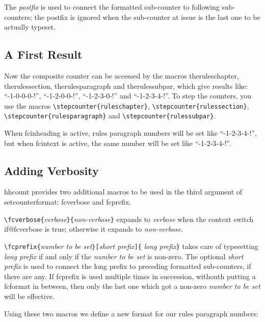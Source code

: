 \documentclass[11pt]{article}
\makeatletter
\def\packagename#1{{\sffamily #1}}     %
\def\macroname#1{{\ttfamily\@ttbs#1}}  %
\def\hhcount{\packagename{hhcount}\xspace}
\def\={\verb=}
\def\<#1>{\macroname{#1}}
\def\:{\linebreak[1]}
\makeatother
\begin{document}
The \textit{postfix} is used to connect the formatted sub-counter to following
sub-counters; the postfix is ignored when the sub-counter at issue is the
last one to be actually typeset.

\subsection{A First Result}

Now the composite counter can be accessed by the macros
\<theruleschapter>, \<therulessection>, \<therulesparagraph>
and \<therulessubpar>, which give results like:
``-1-0-0-0-!'',
``-1-2-0-0-!'', ``-1-2-3-0-!''
and ``-1-2-3-4-!''.
To step the counters, you use the macros
\=\stepcounter=\:\={ruleschapter}=,
\=\stepcounter=\:\={rulessection}=,
\=\stepcounter=\:\={rulesparagraph}= and
\=\stepcounter=\:\={rulessubpar}=.

When \<fcinheading> is active, rules paragraph numbers will be set like
``{\fcinheading{}-1-2-3-4-!}'', but when \<fcintext> is active,
the same number will be set like ``{\fcintext{}-1-2-3-4-!}''.

\subsection{Adding Verbosity}

\hhcount provides two additional macros to be used in the third argument
of \<setcounterformat>: \<fcverbose> and \<fcprefix>.

\=\fcverbose{=\textit{verbose}\=}{=\textit{non-verbose}\=}= expands to
\textit{verbose} when the context switch \<if@fcverbose> is true; otherwise
it expands to \textit{non-verbose}.

\=\fcprefix{=\textit{number to be set}\=}[=\textit{short prefix}\=]{=%
\textit{long prefix}\=}= takes care of typesetting \textit{long prefix}
if and only if the \textit{number to be set} is non-zero. The optional
\textit{short prefix} is used to connect the long prefix to preceding
formatted sub-counters, if there are any. If \<fcprefix> is used multiple
times in succession, withouth putting a \<fcformat> in between, then only
the last one which got a non-zero \textit{number to be set} will be
effective.

Using these two macros we define a new format for our rules paragraph
numbers:
\end{document}
